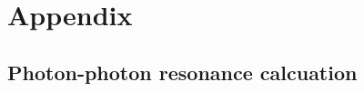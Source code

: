 
{\chapter{Appendix}}\label{chap:appendix}    %

\setcounter{figure}{0}

\section{Photon-photon resonance calcuation}\label{sec:PP_resonance_cal}
